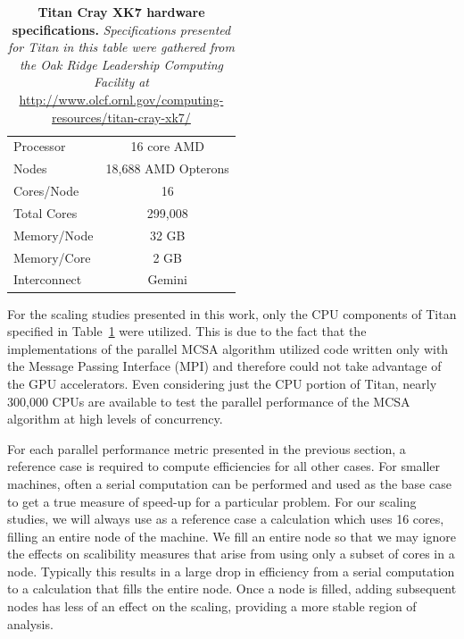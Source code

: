 \begin{table}[h!]
  \begin{center}
    \begin{tabular}{lc}\hline\hline
      Processor & 16 core AMD \\
      Nodes & 18,688 AMD Opterons \\
      Cores/Node & 16 \\
      Total Cores & 299,008 \\
      Memory/Node & 32 GB \\
      Memory/Core & 2 GB \\
      Interconnect & Gemini \\
      \hline\hline
    \end{tabular}
  \end{center}
  \caption{\textbf{Titan Cray XK7 hardware specifications.}
    \textit{Specifications presented for Titan in this table were
      gathered from the Oak Ridge Leadership Computing Facility at}
    \url{http://www.olcf.ornl.gov/computing-resources/titan-cray-xk7/}}
  \label{tab:titan_hardware}
\end{table}

For the scaling studies presented in this work, only the CPU
components of Titan specified in Table~\ref{tab:titan_hardware} were
utilized. This is due to the fact that the implementations of the
parallel MCSA algorithm utilized code written only with the Message
Passing Interface (MPI) and therefore could not take advantage of the
GPU accelerators. Even considering just the CPU portion of Titan,
nearly 300,000 CPUs are available to test the parallel performance of
the MCSA algorithm at high levels of concurrency.

For each parallel performance metric presented in the previous
section, a reference case is required to compute efficiencies for all
other cases. For smaller machines, often a serial computation can be
performed and used as the base case to get a true measure of speed-up
for a particular problem. For our scaling studies, we will always use
as a reference case a calculation which uses 16 cores, filling an
entire node of the machine. We fill an entire node so that we may
ignore the effects on scalibility measures that arise from using only
a subset of cores in a node. Typically this results in a large drop in
efficiency from a serial computation to a calculation that fills the
entire node. Once a node is filled, adding subsequent nodes has less
of an effect on the scaling, providing a more stable region of
analysis.

